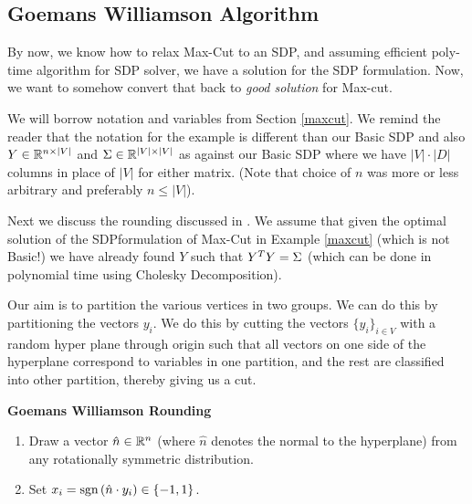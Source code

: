 \subsection{Goemans Williamson Algorithm}
By now, we know how to relax Max-Cut to an SDP, and assuming efficient poly-time algorithm for SDP solver, we have a solution for the SDP formulation. Now, we want to somehow convert that back to \textit{good solution} for Max-cut. 

We will borrow notation and variables from Section \ref{maxcut}. We remind the reader that the notation for the example is different than our Basic SDP and also $Y \in \mathbb{R}^{n \times |V|}$ and $\Sigma \in \mathbb{R}^{|V| \times |V|}$ as against our Basic SDP where we have $|V| \cdot |D|$ columns in place of $|V|$ for either matrix. (Note that choice of $n$ was more or less arbitrary and preferably $n \leq |V|$). 

Next we discuss the rounding discussed in \cite{gwFirstMaxCutSDP}. We assume that given the optimal solution of the SDPformulation of  Max-Cut  in  Example \ref{maxcut}  (which is not Basic!) we have already found $Y$ such that $Y^T Y = \Sigma$ (which can be done in polynomial time using Cholesky Decomposition).

Our aim is to partition the various vertices in two groups. We can do this by partitioning the vectors $y_i$. We do this by cutting the vectors $\{y_i\}_{i \in V}$ with a random hyper plane through origin such that all vectors on one side of the hyperplane correspond to variables in one partition, and the rest are classified into other partition, thereby giving us a cut. 

\begin{algorithm}\textbf{Goemans Williamson Rounding}
\begin{enumerate}
\item Draw a vector $\hat{n} \in \mathbb{R}^n$ (where $\hat{n}$ denotes the normal to the hyperplane) from any rotationally symmetric distribution. 
\item Set $x_i = \mbox{sgn}\left(\hat{n} \cdot y_i\right) \in \{-1, 1 \}$.
\end{enumerate}
\end{algorithm}

